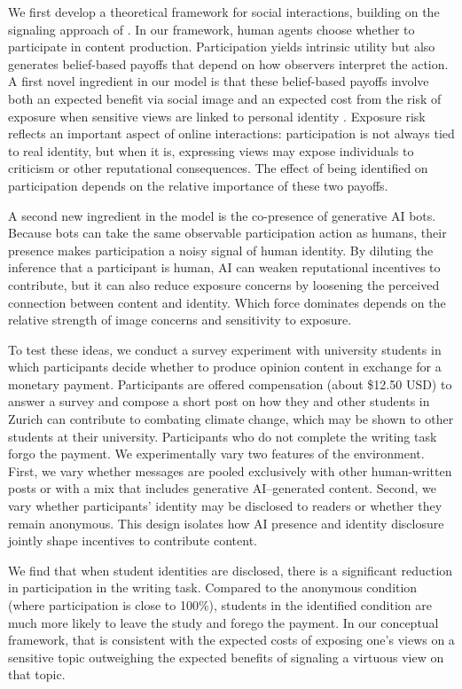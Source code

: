 \documentclass[12pt,notitlepage]{article}
\theoremstyle{plain}
\theoremstyle{plain}
\theoremstyle{definition}
\theoremstyle{definition}
\theoremstyle{assumption}
\theoremstyle{plain}
\theoremstyle{plain}
\theoremstyle{plain}
\theoremstyle{plain}
\theoremstyle{definition}%
\theoremstyle{plain}
\theoremstyle{plain}
\theoremstyle{plain}
\theoremstyle{plain}
\begin{document}
We first develop a theoretical framework for social interactions, building on the signaling approach of \citet{BenabouTirole:06}. In our framework, human agents choose whether to participate in content production. Participation yields intrinsic utility but also generates belief-based payoffs that depend on how observers interpret the action. A first novel ingredient in our model is that these belief-based payoffs involve both an expected benefit via social image and an expected cost from the risk of exposure when sensitive views are linked to personal identity \citep{BursztynJensen:17}. Exposure risk reflects an important aspect of online interactions: participation is not always tied to real identity, but when it is, expressing views may expose individuals to criticism or other reputational consequences. The effect of being identified on participation depends on the relative importance of these two payoffs. 

A second new ingredient in the model is the co-presence of generative AI bots. Because bots can take the same observable participation action as humans, their presence makes participation a noisy signal of human identity. By diluting the inference that a participant is human, AI can weaken reputational incentives to contribute, but it can also reduce exposure concerns by loosening the perceived connection between content and identity. Which force dominates depends on the relative strength of image concerns and sensitivity to exposure.

To test these ideas, we conduct a survey experiment with university students in which participants decide whether to produce opinion content in exchange for a monetary payment. Participants are offered compensation (about \$12.50 USD) to answer a survey and compose a short post on how they and other students in Zurich can contribute to combating climate change, which may be shown to other students at their university. Participants who do not complete the writing task forgo the payment. We experimentally vary two features of the environment. First, we vary whether messages are pooled exclusively with other human-written posts or with a mix that includes generative AI–generated content. Second, we vary whether participants' identity may be disclosed to readers or whether they remain anonymous. This design isolates how AI presence and identity disclosure jointly shape incentives to contribute content.

We find that when student identities are disclosed, there is a significant reduction in participation in the writing task. Compared to the anonymous condition (where participation is close to 100\%), students in the identified condition are much more likely to leave the study and forego the payment. In our conceptual framework, that is consistent with the expected costs of exposing one's views on a sensitive topic outweighing the expected benefits of signaling a virtuous view on that topic. 
\end{document}
